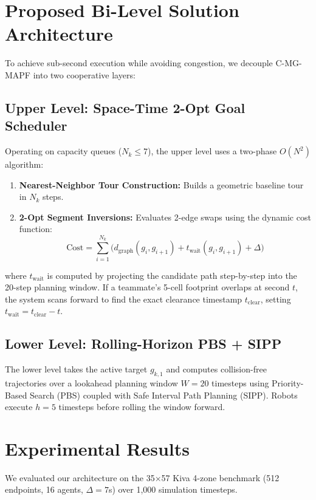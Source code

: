 \documentclass[journal]{IEEEtran}
\begin{document}
\section{Proposed Bi-Level Solution Architecture}

To achieve sub-second execution while avoiding congestion, we decouple C-MG-MAPF into two cooperative layers:

\subsection{Upper Level: Space-Time 2-Opt Goal Scheduler}
Operating on capacity queues ($N_k \le 7$), the upper level uses a two-phase $O(N^2)$ algorithm:
\begin{enumerate}
    \item \textbf{Nearest-Neighbor Tour Construction:} Builds a geometric baseline tour in $N_k$ steps.
    \item \textbf{2-Opt Segment Inversions:} Evaluates 2-edge swaps using the dynamic cost function:
    \begin{equation}
    \text{Cost} = \sum_{i=1}^{N_k} \Big( d_{\text{graph}}(g_i, g_{i+1}) + t_{\text{wait}}(g_i, g_{i+1}) + \Delta \Big)
    \end{equation}
\end{enumerate}
where $t_{\text{wait}}$ is computed by projecting the candidate path step-by-step into the 20-step planning window. If a teammate's 5-cell footprint overlaps at second $t$, the system scans forward to find the exact clearance timestamp $t_{\text{clear}}$, setting $t_{\text{wait}} = t_{\text{clear}} - t$.

\subsection{Lower Level: Rolling-Horizon PBS + SIPP}
The lower level takes the active target $g_{k,1}$ and computes collision-free trajectories over a lookahead planning window $W = 20$ timesteps using Priority-Based Search (PBS) coupled with Safe Interval Path Planning (SIPP). Robots execute $h = 5$ timesteps before rolling the window forward.

\section{Experimental Results}

We evaluated our architecture on the 35$\times$57 Kiva 4-zone benchmark (512 endpoints, 16 agents, $\Delta = 7$s) over 1,000 simulation timesteps.
\end{document}
